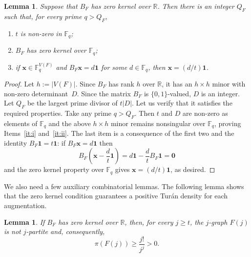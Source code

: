 \documentclass[10pt,a4paper]{article}
\numberwithin{equation}{section}
\newtheorem{lemma}[theorem]{Lemma}
\theoremstyle{definition}
\theoremstyle{remark}
\newcommand{\V}[1]{\boldsymbol{#1}}
\begin{document}
\begin{lemma}\label{lem:app-good-characteristics}
Suppose that $B_F$ has zero kernel over $\mathbb R$.  Then there is an integer $Q_F$ such that, for every prime $q> Q_F$,
\begin{enumerate}[label=\textup{(\roman*)}]
\item\label{it:i} $t$ is non-zero in $\mathbb F_q$;
\item\label{it:ii} $B_F$ has zero kernel over $\mathbb F_q$;
\item\label{it:iii} if $\V{x}\in\mathbb F_q^{V(F)}$ and $B_F\V{x}=d\mathbf 1$ for some $d\in\mathbb F_q$, then $\V{x}=(d/t)\mathbf 1$.
\end{enumerate}
\end{lemma}

\begin{proof}
Let $h:=|V(F)|$.  Since $B_F$ has rank $h$ over $\mathbb R$, it has an $h\times h$ minor with non-zero determinant~$D$. Since the matrix $B_F$ is $\{0,1\}$-valued, $D$ is an integer. Let $Q_F$ be the largest prime divisor of $t|D|$. Let us verify that it satisfies the required properties. Take any prime $q> Q_F$. Then $t$ and $D$ are non-zero as elements of $\mathbb F_q$ and the above $h\times h$ minor remains nonsingular over $\mathbb F_q$, proving Items~\ref{it:i} and~\ref{it:ii}. The last item is a consequence of the first two and the identity $B_F\mathbf 1=t\mathbf 1$: if $B_F\V{x}=d\mathbf 1$ then
\[
 B_F\left(\V{x}-\frac dt\mathbf 1\right)
 =d\mathbf 1-\frac dt B_F\mathbf 1=\V{0}
\]
and the zero kernel property over $\mathbb F_q$ gives $\V{x}=(d/t)\mathbf 1$, as desired.
\end{proof}



We also need a few auxiliary combinatorial lemmas. The following lemma shows that the zero kernel condition guarantees a positive Tur\'an density for each augmentation.

\begin{lemma}\label{lem:app-augmentation-positive}
	If $B_F$ has zero kernel over $\mathbb R$, then,  for every $j\ge t$,  the $j$-graph $F(j)$ is not $j$-partite and, consequently,
	\begin{equation*}
		\pi(F(j))\ge\frac{j!}{j^j}>0.
	\end{equation*}
\end{lemma}
\end{document}
